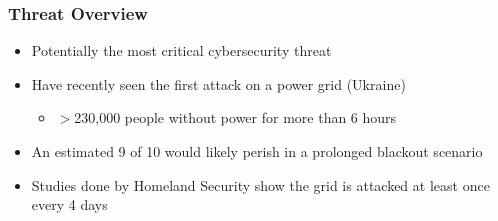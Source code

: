 \begin{frame}
\frametitle{Threat Overview}

\begin{itemize}
    \item Potentially the most critical cybersecurity threat
    \item Have recently seen the first attack on a power grid (Ukraine)
    \begin{itemize}
        \item $>$230,000 people without power for more than 6 hours
    \end{itemize}
    \item An estimated 9 of 10 would likely perish in a prolonged blackout scenario
    \item Studies done by Homeland Security show the grid is attacked at least once every 4 days 
\end{itemize}

\end{frame}
